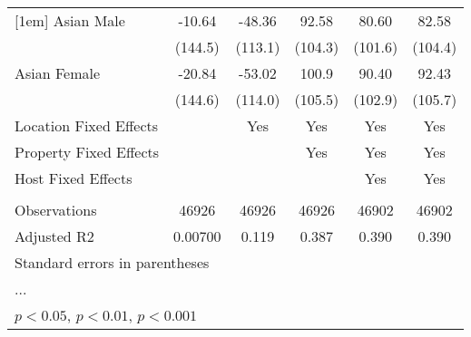 \begin{table}[htbp]
\begin{tabular}{l*{5}{c}}
[1em]
Asian Male          &      -10.64         &      -48.36         &       92.58         &       80.60         &       82.58         \\
                    &     (144.5)         &     (113.1)         &     (104.3)         &     (101.6)         &     (104.4)         \\
[1em]
Asian Female        &      -20.84         &      -53.02         &       100.9         &       90.40         &       92.43         \\
                    &     (144.6)         &     (114.0)         &     (105.5)         &     (102.9)         &     (105.7)         \\
\hline
Location Fixed Effects&                     &         Yes         &         Yes         &         Yes         &         Yes         \\
Property Fixed Effects&                     &                     &         Yes         &         Yes         &         Yes         \\
Host Fixed Effects  &                     &                     &                     &         Yes         &         Yes         \\
\hline \vspace{-1.25em}&                     &                     &                     &                     &                     \\
Observations        &       46926         &       46926         &       46926         &       46902         &       46902         \\
Adjusted R2         &     0.00700         &       0.119         &       0.387         &       0.390         &       0.390         \\
\hline\hline
\multicolumn{6}{l}{\footnotesize Standard errors in parentheses}\\
\multicolumn{6}{l}{\footnotesize ...}\\
\multicolumn{6}{l}{\footnotesize \sym{*} \(p<0.05\), \sym{**} \(p<0.01\), \sym{***} \(p<0.001\)}\\
\end{tabular}
\end{table}
